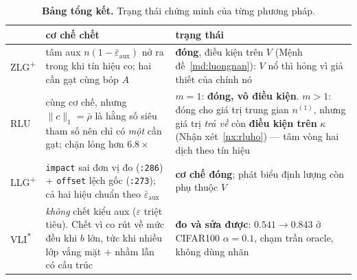 \documentclass[11pt,a4paper]{article}
\theoremstyle{remark}
\newcommand{\epsaux}{\bar\varepsilon_{\mathrm{aux}}}
\newcommand{\code}[1]{\texttt{\small #1}}
\begin{document}
\begin{table}[htbp]
\centering
\caption{\textbf{Bảng tổng kết.} Trạng thái chứng minh của từng phương pháp.}
\label{tab:trangthai}
\small
\begin{tabular}{@{}p{2.2cm}p{6.4cm}p{6.2cm}@{}}
\toprule
 & \textbf{cơ chế chết} & \textbf{trạng thái} \\
\midrule
ZLG\textsuperscript{+}
  & tâm aux $n(1-\epsaux)$ nở ra trong khi tín hiệu co; hai cần gạt cùng bóp $A$
  & \textbf{đóng}, điều kiện trên $V$ (Mệnh đề~\ref{md:luongnan}): $V$ nổ thì
    hỏng vì giả thiết của chính nó \\
RLU
  & cùng cơ chế, nhưng $\|c\|_1=\bar\rho$ là hằng số siêu tham số nên chỉ có
    \emph{một} cần gạt; chặn lỏng hơn $6.8\times$
  & $m{=}1$: \textbf{đóng, vô điều kiện}. $m{>}1$: đóng cho giá trị trung gian
    $n^{(1)}$, nhưng giá trị \emph{trả về} còn \textbf{điều kiện trên} $\kappa$
    (Nhận xét~\ref{nx:rluho}) --- tâm vòng hai dịch theo tín hiệu \\
LLG\textsuperscript{+}
  & \code{impact} sai đơn vị đo (\code{:286}) + \code{offset} lệch gốc
    (\code{:273}); cả hai hiệu chuẩn theo $\epsaux$
  & \textbf{cơ chế đóng}; phát biểu định lượng còn phụ thuộc $V$ \\
VLI\textsuperscript{$*$}
  & \emph{không} chết kiểu aux ($\varepsilon$ triệt tiêu). Chết vì co rút về mức
    đều khi $b$ lớn, tức khi nhiều lớp vắng mặt + nhầm lẫn có cấu trúc
  & \textbf{đo và sửa được}: $0.541\to0.843$ ở CIFAR100 $\alpha{=}0.1$, chạm
    trần oracle, không dùng nhãn \\
\bottomrule
\end{tabular}
\end{table}
\end{document}
